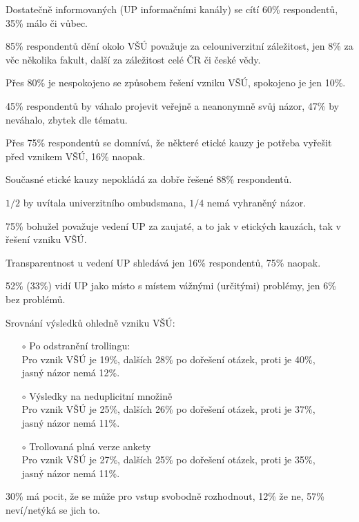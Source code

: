 \documentclass[a4paper,twoside]{article}
\begin{document}
\begin{itemize}
  \item Dostatečně informovaných (UP informačními kanály) se cítí 60\% respondentů, 35\% málo či vůbec.
  \item 85\% respondentů  dění okolo VŠÚ považuje za celouniverzitní záležitost, jen 8\% za věc několika fakult, další za záležitost celé ČR či české vědy.
  \item Přes 80\% je nespokojeno se způsobem řešení vzniku VŠÚ, spokojeno je jen 10\%.
  \item 45\% respondentů by váhalo projevit veřejně a neanonymně svůj názor, 47\% by neváhalo, zbytek dle tématu.
  \item Přes 75\% respondentů se domnívá, že některé etické kauzy je potřeba vyřešit před vznikem VŠÚ, 16\% naopak.
  \item Současné etické kauzy nepokládá za dobře řešené 88\% respondentů.
  \item $1/2$ by uvítala univerzitního ombudsmana, $1/4$ nemá vyhraněný názor.
  \item 75\% bohužel považuje vedení UP za zaujaté, a to jak v etických kauzách, tak v řešení vzniku VŠÚ.
  \item Transparentnost u vedení UP shledává jen 16\% respondentů, 75\% naopak.
  \item 52\% (33\%) vidí UP jako místo s místem vážnými (určitými) problémy, jen 6\% bez problémů.
{\bf 
  \item Srovnání výsledků ohledně vzniku VŠÚ:
    \begin{itemize} 
      \item[$\circ$] Po odstranění trollingu:
      \\ Pro vznik VŠÚ je 19\%, dalších 28\% po dořešení otázek, proti je 40\%, \\ jasný názor nemá 12\%.
      \item[$\circ$] Výsledky na neduplicitní množině
      \\ Pro vznik VŠÚ je 25\%, dalších 26\% po dořešení otázek, proti je 37\%, \\ jasný názor nemá 11\%.
      \item[$\circ$] Trollovaná plná verze ankety
      \\ Pro vznik VŠÚ je 27\%, dalších 25\% po dořešení otázek, proti je 35\%, \\ jasný názor nemá 11\%.
    \end{itemize}
}
  \item 30\% má pocit, že se může pro vstup svobodně rozhodnout, 12\% že ne, 57\% neví/netýká se jich to.

\end{itemize}
\end{document}
